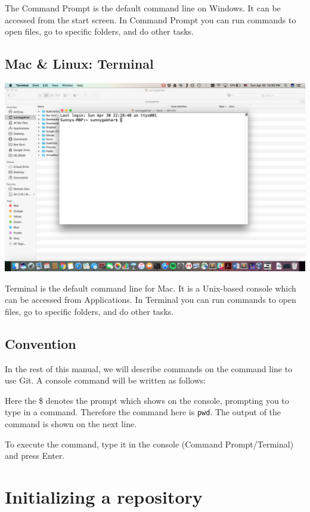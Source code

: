 \documentclass[12pt]{report}
\newcommand\code[1]{{\color{blue}\texttt{#1}}}
\begin{document}
The Command Prompt is the default command line on Windows. It can be accessed from the start screen. In Command Prompt you can run commands to open files, go to specific folders, and do other tasks.

\subsection{Mac \& Linux: Terminal}

\includegraphics[width=\textwidth]{terminal.png}

Terminal is the default command line for Mac. It is a Unix-based console which can be accessed from Applications. In Terminal you can run commands to open files, go to specific folders, and do other tasks.

\subsection{Convention}

In the rest of this manual, we will describe commands on the command line to use Git. A console command will be written as follows:


Here the \$ denotes the prompt which shows on the console, prompting you to type in a command. Therefore the command here is \code{pwd}. The output of the command is shown on the next line.

To execute the command, type it in the console (Command Prompt/Terminal) and press Enter. 


\section{Initializing a repository}
\end{document}
